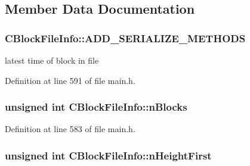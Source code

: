 \subsection{Member Data Documentation}
\hypertarget{class_c_block_file_info_ab4daf4df00f90dee15e3a7d2cdb7a273}{}
\subsubsection[{A\+D\+D\+\_\+\+S\+E\+R\+I\+A\+L\+I\+Z\+E\+\_\+\+M\+E\+T\+H\+O\+D\+S}]{\setlength{\rightskip}{0pt plus 5cm}C\+Block\+File\+Info\+::\+A\+D\+D\+\_\+\+S\+E\+R\+I\+A\+L\+I\+Z\+E\+\_\+\+M\+E\+T\+H\+O\+D\+S}\label{class_c_block_file_info_ab4daf4df00f90dee15e3a7d2cdb7a273}


latest time of block in file 



Definition at line 591 of file main.\+h.

\hypertarget{class_c_block_file_info_adf2de4bb4d8a0a8f2116ed90f0770d03}{}
\subsubsection[{n\+Blocks}]{\setlength{\rightskip}{0pt plus 5cm}unsigned int C\+Block\+File\+Info\+::n\+Blocks}\label{class_c_block_file_info_adf2de4bb4d8a0a8f2116ed90f0770d03}


Definition at line 583 of file main.\+h.

\hypertarget{class_c_block_file_info_a66d258b11b1aec30cbacdc6130c271a8}{}
\subsubsection[{n\+Height\+First}]{\setlength{\rightskip}{0pt plus 5cm}unsigned int C\+Block\+File\+Info\+::n\+Height\+First}\label{class_c_block_file_info_a66d258b11b1aec30cbacdc6130c271a8}


